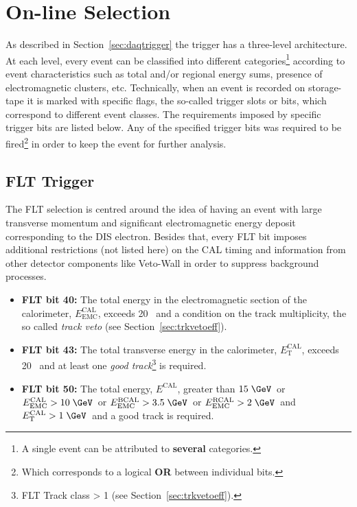 \section{On-line Selection}
\label{sec:onlineselect}
As described in Section~\ref{sec:daqtrigger} the \zeus trigger has a three-level architecture. At each level, every event can be classified into different categories\footnote{A single event can be attributed to \textbf{several} categories.} according to event characteristics such as total and/or regional energy sums, presence of electromagnetic clusters, etc. Technically, when an event is recorded on storage-tape it is marked with specific flags, the so-called trigger slots or bits, which correspond to different event classes. The requirements imposed by specific trigger bits are listed below. Any of the specified trigger bits was required to be fired\footnote{Which corresponds to a logical \textbf{OR} between individual bits.} in order to keep the event for further analysis. 

\subsection{FLT Trigger}
\label{subsec:fltcuts}
The FLT selection is centred around the idea of having an event with large transverse momentum and significant electromagnetic energy deposit corresponding to the DIS electron. Besides that, every FLT bit imposes additional restrictions (not listed here) on the CAL timing and information from other detector components like Veto-Wall in order to suppress background processes.
\begin{itemize}
	\item \textbf{FLT bit 40:} The total energy in the electromagnetic section of the calorimeter, $E_\text{EMC}^\text{CAL}$, exceeds 20 \GeV\, and a condition on the track multiplicity, the so called \textit{track veto} (see Section~\ref{sec:trkvetoeff}).
	\item \textbf{FLT bit 43:} The total transverse energy in the calorimeter, $E_\text{T}^\text{CAL}$, exceeds 20 \GeV\, and at least one \textit{good track}\footnote{FLT Track class > 1 (see Section~\ref{sec:trkvetoeff}).} is required.
	\item \textbf{FLT bit 50:} The total energy, $E^\text{CAL}$, greater than $15\; \GeV$\, or $E_\text{EMC}^\text{CAL} > 10\; \GeV\,$ or $E_\text{EMC}^\text{BCAL} > 3.5\; \GeV$\, or $E_\text{EMC}^\text{RCAL} > 2\; \GeV$\, and $E_\text{T}^\text{CAL} > 1\; \GeV$\, and a good track is required.
\end{itemize}

